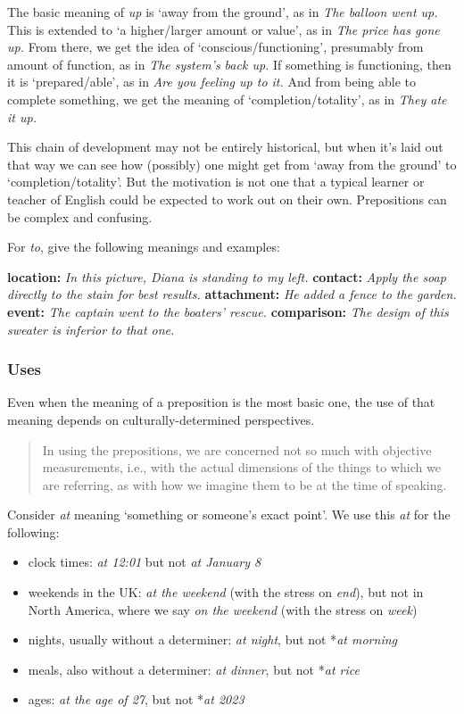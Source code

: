 The basic meaning of \textit{up} is `away from the ground', as in \textit{The balloon went up.} This is extended to `a higher/larger amount or value', as in \textit{The price has gone up.} From there, we get the idea of `conscious/functioning', presumably from amount of function, as in \textit{The system's back up.} If something is functioning, then it is `prepared/able', as in \textit{Are you feeling up to it.} And from being able to complete something, we get the meaning of `completion/totality', as in \textit{They ate it up.} 

This chain of development may not be entirely historical, but when it's laid out that way we can see how (possibly) one might get from `away from the ground' to `completion/totality'. But the motivation is not one that a typical learner or teacher of English could be expected to work out on their own. Prepositions can be complex and confusing.

For \textit{to}, \citet{tyler2003} give the following meanings and examples:

\ea \label{ex:to-meanings}
    \ea \textbf{location:} \textit{In this picture, Diana is standing to my left.}
    \ex \textbf{contact:} \textit{Apply the soap directly to the stain for best results.}
    \ex \textbf{attachment:} \textit{He added a fence to the garden.}
    \ex \textbf{event:} \textit{The captain went to the boaters' rescue.}
    \ex \textbf{comparison:} \textit{The design of this sweater is inferior to that one.}
    \z
\z

\subsubsection*{Uses}

Even when the meaning of a preposition is the most basic one, the use of that meaning depends on culturally-determined perspectives.

\begin{quote}
    In using the prepositions, we are concerned not so much with objective measurements, i.e., with the actual dimensions of the things to which we are referring, as with how we imagine them to be at the time of speaking. \citep{close1992}
\end{quote}

Consider \textit{at} meaning `something or someone's exact point'. We use this \textit{at} for the following:

\begin{itemize}
    \item clock times: \textit{at 12:01} but not \textit{at January 8}
    \item weekends in the UK: \textit{at the weekend} (with the stress on \textit{end}), but not in North America, where we say \textit{on the weekend} (with the stress on \textit{week})
    \item nights, usually without a determiner: \textit{at night}, but not *\textit{at morning}
    \item meals, also without a determiner: \textit{at dinner}, but not *\textit{at rice}
    \item ages: \textit{at the age of 27}, but not *\textit{at 2023}
\end{itemize}

